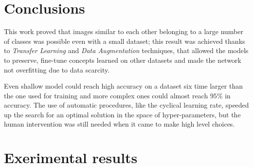 \section{Conclusions}
This work proved that images similar to each other belonging to a large number of classes was possible even with a small dataset; this result was achieved thanks to \textit{Transfer Learning} and \textit{Data Augmentation} techniques, that allowed the models to preserve, fine-tune concepts learned on other datasets and made the network not overfitting due to data scarcity. \par
Even shallow model could reach high accuracy on a dataset six time larger than the one used for training and more complex ones could almost reach $95\%$ in accuracy. The use of automatic procedures, like the cyclical learning rate, speeded up the search for an optimal solution in the space of hyper-parameters, but the human intervention was still needed when it came to make high level choices.











\newpage
\appendix
\section{Exerimental results}


